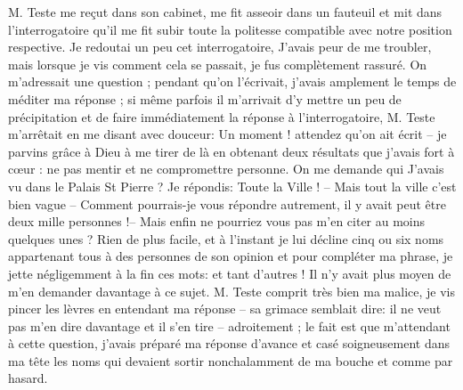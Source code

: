 \documentclass[11pt,a4paper]{report}
\begin{document}
M. Teste me reçut dans son cabinet, me fit asseoir dans un fauteuil et mit dans l'interrogatoire qu'il me fit subir toute la politesse compatible avec notre position respective. Je redoutai un peu cet interrogatoire, J'avais peur de me troubler, mais lorsque je vis comment cela se passait, je fus complètement rassuré. On m'adressait une question ; pendant qu'on l'écrivait, j'avais amplement le temps de méditer ma réponse ; si même parfois il m'arrivait d'y mettre un peu de précipitation et de faire immédiatement la réponse à l'interrogatoire, M. Teste m'arrêtait en me disant avec douceur: Un moment ! attendez qu'on ait écrit -- je parvins grâce à Dieu à me tirer de là en obtenant deux résultats que j'avais fort à cœur : ne pas mentir et ne compromettre personne. On me demande qui J'avais vu dans le Palais St Pierre ? Je répondis: Toute la Ville ! -- Mais tout la ville c'est bien vague -- Comment pourrais-je vous répondre autrement, il y avait peut être deux mille personnes !-- Mais enfin ne pourriez vous pas m'en citer au moins quelques unes ? Rien de plus facile, et à l'instant je lui décline cinq ou six noms appartenant tous à des personnes de son opinion et pour compléter ma phrase, je jette négligemment à la fin ces mots: et tant d'autres ! Il n'y avait plus moyen de m'en demander davantage à ce sujet. M. Teste comprit très bien ma malice, je vis pincer les lèvres en entendant ma réponse -- sa grimace semblait dire: il ne veut pas m'en dire davantage et il s'en tire -- adroitement ; le fait est que m'attendant à cette question, j'avais préparé ma réponse d'avance et casé soigneusement dans ma tête les noms qui devaient sortir nonchalamment de ma bouche et comme par hasard.
\end{document}
